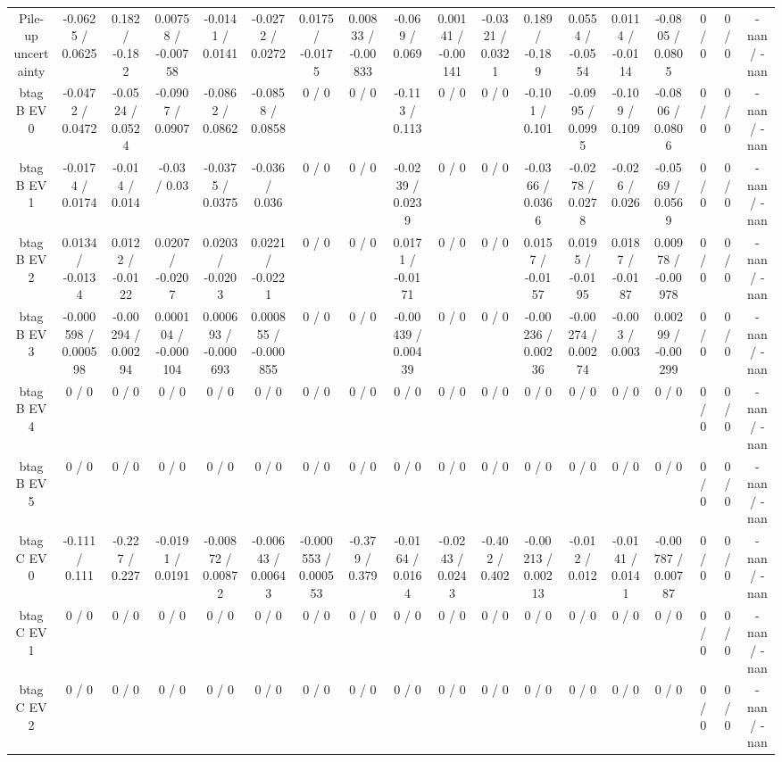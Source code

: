\documentclass[10pt]{article}
\begin{document}
\begin{table}[htbp]
\begin{center}
\begin{tabular}{|c|c|c|c|c|c|c|c|c|c|c|c|c|c|c|c|c|c|}
  Pile-up uncertainty & -0.0625 / 0.0625 & 0.182 / -0.182 & 0.00758 / -0.00758 & -0.0141 / 0.0141 & -0.0272 / 0.0272 & 0.0175 / -0.0175 & 0.00833 / -0.00833 & -0.069 / 0.069 & 0.00141 / -0.00141 & -0.0321 / 0.0321 & 0.189 / -0.189 & 0.0554 / -0.0554 & 0.0114 / -0.0114 & -0.0805 / 0.0805 & 0 / 0 & 0 / 0 & -nan / -nan \\ 
  btag B EV 0 & -0.0472 / 0.0472 & -0.0524 / 0.0524 & -0.0907 / 0.0907 & -0.0862 / 0.0862 & -0.0858 / 0.0858 & 0 / 0 & 0 / 0 & -0.113 / 0.113 & 0 / 0 & 0 / 0 & -0.101 / 0.101 & -0.0995 / 0.0995 & -0.109 / 0.109 & -0.0806 / 0.0806 & 0 / 0 & 0 / 0 & -nan / -nan \\ 
  btag B EV 1 & -0.0174 / 0.0174 & -0.014 / 0.014 & -0.03 / 0.03 & -0.0375 / 0.0375 & -0.036 / 0.036 & 0 / 0 & 0 / 0 & -0.0239 / 0.0239 & 0 / 0 & 0 / 0 & -0.0366 / 0.0366 & -0.0278 / 0.0278 & -0.026 / 0.026 & -0.0569 / 0.0569 & 0 / 0 & 0 / 0 & -nan / -nan \\ 
  btag B EV 2 & 0.0134 / -0.0134 & 0.0122 / -0.0122 & 0.0207 / -0.0207 & 0.0203 / -0.0203 & 0.0221 / -0.0221 & 0 / 0 & 0 / 0 & 0.0171 / -0.0171 & 0 / 0 & 0 / 0 & 0.0157 / -0.0157 & 0.0195 / -0.0195 & 0.0187 / -0.0187 & 0.00978 / -0.00978 & 0 / 0 & 0 / 0 & -nan / -nan \\ 
  btag B EV 3 & -0.000598 / 0.000598 & -0.00294 / 0.00294 & 0.000104 / -0.000104 & 0.000693 / -0.000693 & 0.000855 / -0.000855 & 0 / 0 & 0 / 0 & -0.00439 / 0.00439 & 0 / 0 & 0 / 0 & -0.00236 / 0.00236 & -0.00274 / 0.00274 & -0.003 / 0.003 & 0.00299 / -0.00299 & 0 / 0 & 0 / 0 & -nan / -nan \\ 
  btag B EV 4 & 0 / 0 & 0 / 0 & 0 / 0 & 0 / 0 & 0 / 0 & 0 / 0 & 0 / 0 & 0 / 0 & 0 / 0 & 0 / 0 & 0 / 0 & 0 / 0 & 0 / 0 & 0 / 0 & 0 / 0 & 0 / 0 & -nan / -nan \\ 
  btag B EV 5 & 0 / 0 & 0 / 0 & 0 / 0 & 0 / 0 & 0 / 0 & 0 / 0 & 0 / 0 & 0 / 0 & 0 / 0 & 0 / 0 & 0 / 0 & 0 / 0 & 0 / 0 & 0 / 0 & 0 / 0 & 0 / 0 & -nan / -nan \\ 
  btag C EV 0 & -0.111 / 0.111 & -0.227 / 0.227 & -0.0191 / 0.0191 & -0.00872 / 0.00872 & -0.00643 / 0.00643 & -0.000553 / 0.000553 & -0.379 / 0.379 & -0.0164 / 0.0164 & -0.0243 / 0.0243 & -0.402 / 0.402 & -0.00213 / 0.00213 & -0.012 / 0.012 & -0.0141 / 0.0141 & -0.00787 / 0.00787 & 0 / 0 & 0 / 0 & -nan / -nan \\ 
  btag C EV 1 & 0 / 0 & 0 / 0 & 0 / 0 & 0 / 0 & 0 / 0 & 0 / 0 & 0 / 0 & 0 / 0 & 0 / 0 & 0 / 0 & 0 / 0 & 0 / 0 & 0 / 0 & 0 / 0 & 0 / 0 & 0 / 0 & -nan / -nan \\ 
  btag C EV 2 & 0 / 0 & 0 / 0 & 0 / 0 & 0 / 0 & 0 / 0 & 0 / 0 & 0 / 0 & 0 / 0 & 0 / 0 & 0 / 0 & 0 / 0 & 0 / 0 & 0 / 0 & 0 / 0 & 0 / 0 & 0 / 0 & -nan / -nan \\ 

\end{tabular}
\end{center}
\end{table}
\end{document}
